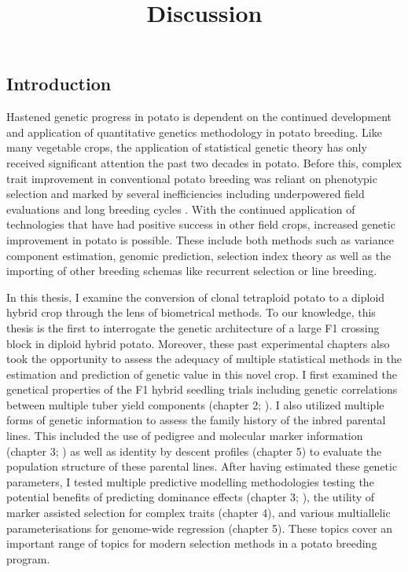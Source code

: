 \documentclass[
]{article}
\title{Discussion}
\author{}
\date{}
\begin{document}
\maketitle


\subsection{Introduction}\label{introduction}

Hastened genetic progress in potato is dependent on the continued
development and application of quantitative genetics methodology in
potato breeding. Like many vegetable crops, the application of
statistical genetic theory has only received significant attention the
past two decades in potato. Before this, complex trait improvement in
conventional potato breeding was reliant on phenotypic selection and
marked by several inefficiencies including underpowered field
evaluations and long breeding cycles \autocite{Bradshaw2017}. With the
continued application of technologies that have had positive success in
other field crops, increased genetic improvement in potato is possible.
These include both methods such as variance component estimation,
genomic prediction, selection index theory as well as the importing of
other breeding schemas like recurrent selection or line breeding.

In this thesis, I examine the conversion of clonal tetraploid potato to
a diploid hybrid crop through the lens of biometrical methods. To our
knowledge, this thesis is the first to interrogate the genetic
architecture of a large F1 crossing block in diploid hybrid potato.
Moreover, these past experimental chapters also took the opportunity to
assess the adequacy of multiple statistical methods in the estimation
and prediction of genetic value in this novel crop. I first examined the
genetical properties of the F1 hybrid seedling trials including genetic
correlations between multiple tuber yield components (chapter 2;
\textcite{Adams2022}). I also utilized multiple forms of genetic
information to assess the family history of the inbred parental lines.
This included the use of pedigree and molecular marker information
(chapter 3; \textcite{Adams2023}) as well as identity by descent
profiles (chapter 5) to evaluate the population structure of these
parental lines. After having estimated these genetic parameters, I
tested multiple predictive modelling methodologies testing the potential
benefits of predicting dominance effects (chapter 3;
\textcite{Adams2023}), the utility of marker assisted selection for
complex traits (chapter 4), and various multiallelic parameterisations
for genome-wide regression (chapter 5). These topics cover an important
range of topics for modern selection methods in a potato breeding
program.
\end{document}
